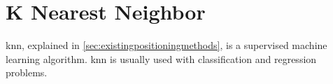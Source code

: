 \section{K Nearest Neighbor}
\gls{knn}, explained in \autoref{sec:existingpositioningmethods}, is a supervised machine learning algorithm. \gls{knn} is usually used with classification and regression problems. 
%